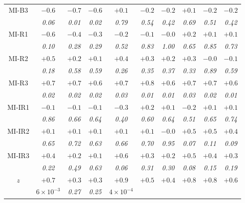 \documentclass{aa}
\begin{document}
\begin{table}
\begin{tabular}{cccccccccc}
        MI-B3  &$-0.6$  &$-0.7$  &$-0.6$  &$+0.1$  &$-0.2$  &$-0.2$  &$+0.1$  &$-0.2$  &$-0.2$  \\
               &\textit{0.06}  &\textit{0.01}  &\textit{0.02}  &\textit{0.79}  &\textit{0.54}  &\textit{0.42}  &\textit{0.69}  &\textit{0.51}  &\textit{0.42}  \\
        MI-R1  &$-0.6$  &$-0.4$  &$-0.3$  &$-0.2$  &$-0.1$  &$-0.0$  &$+0.2$  &$+0.1$  &$+0.1$  \\
               &\textit{0.10}  &\textit{0.28}  &\textit{0.29}  &\textit{0.52}  &\textit{0.83}  &\textit{1.00}  &\textit{0.65}  &\textit{0.85}  &\textit{0.73}  \\
        MI-R2  &$+0.5$  &$+0.2$  &$+0.1$  &$+0.4$  &$+0.3$  &$+0.2$  &$+0.3$  &$-0.0$  &$-0.1$  \\
               &\textit{0.18}  &\textit{0.58}  &\textit{0.59}  &\textit{0.26}  &\textit{0.35}  &\textit{0.37}  &\textit{0.33}  &\textit{0.89}  &\textit{0.59}  \\
        MI-R3  &$+0.7$  &$+0.7$  &$+0.6$  &$+0.7$  &$+0.8$  &$+0.6$  &$+0.7$  &$+0.7$  &$+0.6$  \\
               &\textit{0.02}  &\textit{0.02}  &\textit{0.02}  &\textit{0.03}  &\textit{0.01}  &\textit{0.01}  &\textit{0.03}  &\textit{0.02}  &\textit{0.01}  \\
       MI-IR1  &$-0.1$  &$-0.1$  &$-0.1$  &$-0.3$  &$+0.2$  &$+0.1$  &$-0.2$  &$+0.1$  &$+0.1$  \\
               &\textit{0.86}  &\textit{0.66}  &\textit{0.64}  &\textit{0.40}  &\textit{0.60}  &\textit{0.64}  &\textit{0.51}  &\textit{0.65}  &\textit{0.74}  \\
       MI-IR2  &$+0.1$  &$+0.1$  &$+0.1$  &$+0.1$  &$+0.1$  &$-0.0$  &$+0.5$  &$+0.5$  &$+0.4$  \\
               &\textit{0.65}  &\textit{0.72}  &\textit{0.63}  &\textit{0.66}  &\textit{0.70}  &\textit{0.95}  &\textit{0.07}  &\textit{0.11}  &\textit{0.09}  \\
       MI-IR3  &$+0.4$  &$+0.2$  &$+0.1$  &$+0.6$  &$+0.3$  &$+0.2$  &$+0.5$  &$+0.4$  &$+0.3$  \\
               &\textit{0.22}  &\textit{0.49}  &\textit{0.63}  &\textit{0.06}  &\textit{0.31}  &\textit{0.30}  &\textit{0.08}  &\textit{0.15}  &\textit{0.19}  \\
       $z$  &$+0.7$  &$+0.3$  &$+0.3$  &$+0.9$  &$+0.5$  &$+0.4$  &$+0.8$  &$+0.8$  &$+0.6$  \\
            &\textit{$6 \times 10^{-3}$}  &\textit{0.27}  &\textit{0.25}  &\textit{$4 \times 10^{-4}$}

\end{tabular}
\end{table}
\end{document}
